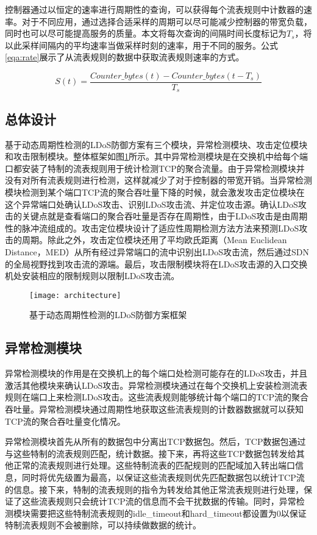 控制器通过以恒定的速率进行周期性的查询，可以获得每个流表规则中计数器的速率。对于不同应用，通过选择合适采样的周期可以尽可能减少控制器的带宽负载，同时也可以尽可能提高服务的质量。本文将每次查询的间隔时间长度标记为$T_s$，将以此采样间隔内的平均速率当做采样时刻的速率，用于不同的服务。公式\ref{eqa:rate}展示了从流表规则的数据中获取流表规则速率的方式。

\begin{equation}
	\label{eqa:rate}
	S(t) = \frac{Counter\_bytes(t) - Counter\_bytes(t - T_s)}{T_s}
\end{equation}

\subsection{总体设计}
\label{chap4:overview}

基于动态周期性检测的LDoS防御方案有三个模块，异常检测模块、攻击定位模块和攻击限制模块。整体框架如图\ref{fig:architecture}所示。其中异常检测模块是在交换机中给每个端口都安装了特制的流表规则用于统计检测TCP的聚合流量。由于异常检测模块并没有对所有流表规则进行检测，这样就减少了对于控制器的带宽开销。当异常检测模块检测到某个端口TCP流的聚合吞吐量下降的时候，就会激发攻击定位模块在这个异常端口处确认LDoS攻击、识别LDoS攻击流、并定位攻击源。确认LDoS攻击的关键点就是查看端口的聚合吞吐量是否存在周期性，由于LDoS攻击是由周期性的脉冲流组成的。攻击定位模块设计了适应性周期检测方法方法来预测LDoS攻击的周期。除此之外，攻击定位模块还用了平均欧氏距离（Mean Euclidean Distance，MED）从所有经过异常端口的流中识别出LDoS攻击流，然后通过SDN的全局视野找到攻击流的源端。最后，攻击限制模块将在LDoS攻击源的入口交换机处安装相应的限制规则以限制LDoS攻击流。

\begin{figure}
    \centering
    \texttt{[image: architecture]}
    \caption{基于动态周期性检测的LDoS防御方案框架}
    \label{fig:architecture}
\end{figure}

\subsection{异常检测模块}
\label{chap4:Monitor}
异常检测模块的作用是在交换机上的每个端口处检测可能存在的LDoS攻击，并且激活其他模块来确认LDoS攻击。异常检测模块通过在每个交换机上安装检测流表规则在端口上来检测LDoS攻击。这些流表规则能够统计每个端口的TCP流的聚合吞吐量。异常检测模块通过周期性地获取这些流表规则的计数器数据就可以获知TCP流的聚合吞吐量变化情况。

异常检测模块首先从所有的数据包中分离出TCP数据包。然后，TCP数据包通过与这些特制的流表规则匹配，统计数据。接下来，再将这些TCP数据包转发给其他正常的流表规则进行处理。这些特制流表的匹配规则的匹配域加入转出端口信息，同时将优先级置为最高，以保证这些流表规则优先匹配数据包以统计TCP流的信息。接下来，特制的流表规则的指令为转发给其他正常流表规则进行处理，保证了这些流表规则只会统计TCP流的信息而不会干扰数据的传输。同时，异常检测模块需要把这些特制流表规则的idle\_timeout和hard\_timeout都设置为0以保证特制流表规则不会被删除，可以持续做数据的统计。


